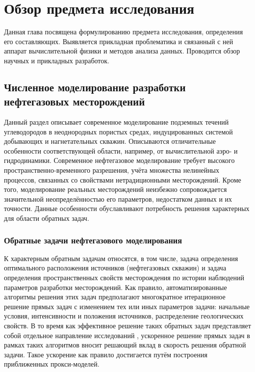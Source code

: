 \chapter{Обзор предмета исследования}\label{ch:ch1}

Данная глава посвящена формулированию предмета исследования, определения его составляющих.
Выявляется прикладная проблематика и связанный с ней аппарат вычислительной физики и методов анализа данных. Проводится обзор научных и прикладных разработок.

\section{Численное моделирование разработки нефтегазовых месторождений}

Данный раздел описывает современное моделирование подземных течений углеводородов в неоднородных пористых средах, индуцированных системой добывающих и нагнетательных скважин.
Описываются отличительные особенности соответствующей области, например, от вычислительной аэро- и гидродинамики.
Современное нефтегазовое моделирование требует высокого пространственно-временного разрешения, учёта множества нелинейных процессов, связанных со свойствами нетрадиционными месторождений.
Кроме того, моделирование реальных месторождений неизбежно сопровождается значительной неопределённостью его параметров, недостатком данных и их точности.
Данные особенности обуславливают потребность решения характерных для области обратных задач.

\subsection{Обратные задачи нефтегазового моделирования}
К характерным обратным задачам относятся, в том числе, задача определения оптимального расположения источников (нефтегазовых скважин) и задача определения пространственных свойств месторождения по истории наблюдений параметров разработки месторождений.
Как правило, автоматизированные алгоритмы решения этих задач предполагают многократное итерационное решение прямых задач с изменением тех или иных параметров задачи: начальные условия, интенсивности и положения источников, распределение геологических свойств. В то время как эффективное решение таких обратных задач представляет собой отдельное направление исследований {\cite{Elizarev2020,Elizarev_2021}}, ускоренное решение прямых задач в рамках таких алгоритмов вносит решающий вклад в скорость решения обратной задачи. Такое ускорение как правило достигается путём построения приближенных прокси-моделей.

